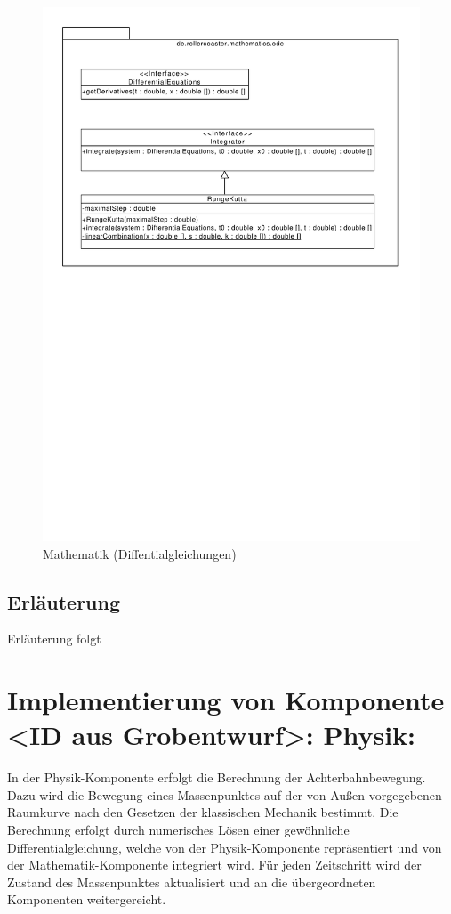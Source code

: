 \begin{figure}
\includegraphics[width=\linewidth]{bilder/Mathematics_ODE}
\caption{Mathematik (Diffentialgleichungen)}
\end{figure}

\subsection{Erläuterung}

Erläuterung folgt

\section{Implementierung von Komponente
         <ID aus Grobentwurf>: Physik:}

In der Physik-Komponente erfolgt die Berechnung der Achterbahnbewegung. Dazu wird
die Bewegung eines Massenpunktes auf der von Außen vorgegebenen Raumkurve
nach den Gesetzen der klassischen Mechanik bestimmt. Die Berechnung erfolgt
durch numerisches Lösen einer gewöhnliche Differentialgleichung, welche von der
Physik-Komponente repräsentiert und von der Mathematik-Komponente integriert wird.
Für jeden Zeitschritt wird der Zustand des Massenpunktes aktualisiert und an die
übergeordneten Komponenten weitergereicht.

